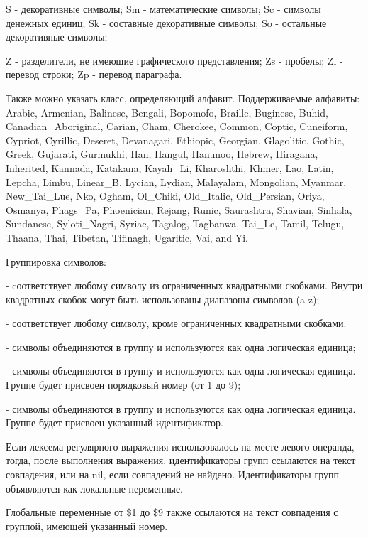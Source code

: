 S - декоративные символы; Sm - математические символы; Sc - символы денежных единиц;	Sk - составные декоративные символы; So - остальные декоративные символы;

Z - разделители, не имеющие графического представления; Zs - пробелы; Zl - перевод строки; Zp - перевод параграфа.

Также можно указать класс, определяющий алфавит. Поддерживаемые алфавиты: Arabic, Armenian, Balinese, Bengali, Bopomofo, Braille, Buginese, Buhid, Canadian_Aboriginal, Carian, Cham, Cherokee, Common, Coptic, Cuneiform, Cypriot, Cyrillic, Deseret, Devanagari, Ethiopic, Georgian, Glagolitic, Gothic, Greek, Gujarati, Gurmukhi, Han, Hangul, Hanunoo, Hebrew, Hiragana, Inherited, Kannada, Katakana, Kayah_Li, Kharoshthi, Khmer, Lao, Latin, Lepcha, Limbu, Linear_B, Lycian, Lydian, Malayalam, Mongolian, Myanmar, New_Tai_Lue, Nko, Ogham, Ol_Chiki, Old_Italic, Old_Persian, Oriya, Osmanya, Phags_Pa, Phoenician, Rejang, Runic, Saurashtra, Shavian, Sinhala, Sundanese, Syloti_Nagri, Syriac, Tagalog, Tagbanwa, Tai_Le, Tamil, Telugu, Thaana, Thai, Tibetan, Tifinagh, Ugaritic, Vai, and Yi.

\begin{keylist}{Группировка символов:}
  
   - cоответствует любому символу из ограниченных квадратными скобками. Внутри квадратных скобок могут быть использованы диапазоны символов (a-z);
  
   - соответствует любому символу, кроме ограниченных квадратными скобками.
  
   - символы объединяются в группу и используются как одна логическая единица;
  
   - символы объединяются в группу и используются как одна логическая единица. Группе будет присвоен порядковый номер (от 1 до 9);
  
   - символы объединяются в группу и используются как одна логическая единица. Группе будет присвоен указанный идентификатор.
\end{keylist}

Если лексема регулярного выражения использовалось на месте левого операнда, тогда, после выполнения выражения, идентификаторы групп ссылаются на текст совпадения, или на nil, если совпадений не найдено. Идентификаторы групп объявляются как локальные переменные.

Глобальные переменные от \$1 до \$9 также ссылаются на текст совпадения с группой, имеющей указанный номер.


